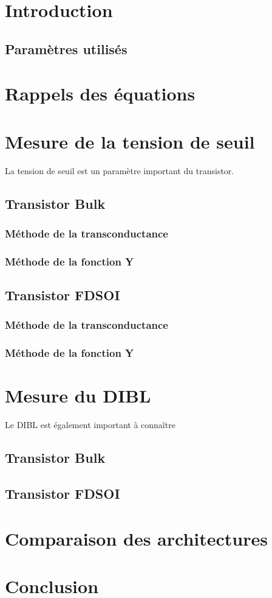 \documentclass[a4paper,11pt]{report}
\begin{document}


\chapter*{Introduction}

\section*{Paramètres utilisés}

\chapter{Rappels des équations}

\chapter{Mesure de la tension de seuil}
La tension de seuil est un paramètre important du transistor. %
\section{Transistor Bulk}

\subsection{Méthode de la transconductance}

\subsection{Méthode de la fonction Y}

\section{Transistor FDSOI}

\subsection{Méthode de la transconductance}

\subsection{Méthode de la fonction Y}

\chapter{Mesure du DIBL}
Le DIBL est également important à connaître %
\section{Transistor Bulk}

\section{Transistor FDSOI}

\chapter{Comparaison des architectures}

\chapter*{Conclusion}
\end{document}
